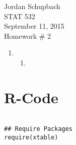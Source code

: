 \documentclass[12pt]{article}\usepackage[]{graphicx}\usepackage[]{color}
\begin{document}
{ \flushright Jordan Schupbach \\
STAT 532\\
September 11, 2015 \\}
Homework \# 2\\

\begin{enumerate}
\item 
\begin{enumerate}[label=(\alph*)]
\item
\end{enumerate}
\end{enumerate}
\newpage
\section*{R-Code}
\begin{verbatim}

## Require Packages
require(xtable)


\end{verbatim}
\end{document}
